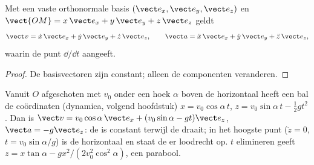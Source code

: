 \begin{proposition}\label{prop:b1:point-kinematics:cartesian}
Met een vaste orthonormale basis $(\vect e_x, \vect e_y, \vect e_z)$ en
$\vect{OM} = x\,\vect e_x + y\,\vect e_y + z\,\vect e_z$ geldt
\[
\vect v = \dot x\,\vect e_x + \dot y\,\vect e_y + \dot z\,\vect e_z, \qquad
\vect a = \ddot x\,\vect e_x + \ddot y\,\vect e_y + \ddot z\,\vect e_z,
\]
waarin de punt $\dd/\dd t$ aangeeft.
\end{proposition}

\begin{proof}
De basisvectoren zijn constant; alleen de componenten veranderen.
\end{proof}

\begin{example}[Worp]\label{ex:b1:point-kinematics:projectile}
Vanuit $O$ afgeschoten met  $v_0$ onder een hoek $\alpha$ boven de
horizontaal heeft een bal de coördinaten (dynamica, volgend hoofdstuk)
$x = v_0\cos\alpha\,t$, $z = v_0\sin\alpha\,t - \tfrac12 gt^2$. Dan is
$\vect v = v_0\cos\alpha\,\vect e_x + (v_0\sin\alpha - gt)\vect e_z$,
$\vect a = -g\vect e_z$: de  is constant terwijl de
 draait; in het hoogste punt ($\dot z = 0$, $t = v_0\sin\alpha/g$) is de
 horizontaal en staat de  er loodrecht op.
$t$ elimineren geeft $z = x\tan\alpha - gx^2/(2v_0^2\cos^2\alpha)$, een
parabool.
\end{example}

